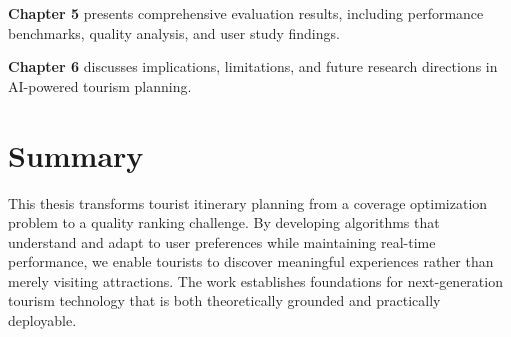 \textbf{Chapter 5} presents comprehensive evaluation results, including performance benchmarks, quality analysis, and user study findings.

\textbf{Chapter 6} discusses implications, limitations, and future research directions in AI-powered tourism planning.

\section{Summary}

This thesis transforms tourist itinerary planning from a coverage optimization problem to a quality ranking challenge. By developing algorithms that understand and adapt to user preferences while maintaining real-time performance, we enable tourists to discover meaningful experiences rather than merely visiting attractions. The work establishes foundations for next-generation tourism technology that is both theoretically grounded and practically deployable.
